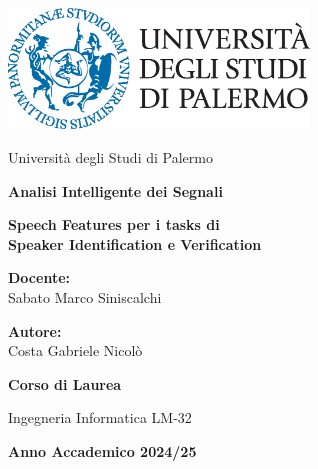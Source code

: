 \documentclass[12pt]{report}
\begin{document}


\begin{titlepage}
    \centering
    
    \includegraphics[width=0.6\textwidth]{logounipa.png} 
    
    \vspace{1cm}
    
    {\large Università degli Studi di Palermo \par}
    
    \vspace{1cm}
    
    {\Large \bfseries Analisi Intelligente dei Segnali \par}
    
    \vspace{1.5cm}
    
    {\Huge \textbf{Speech Features per i tasks di \\ Speaker Identification e Verification} \par}
    \vspace{2cm}
    
    \noindent
    \begin{minipage}{0.45\textwidth}
        \raggedright
        {\large \bfseries Docente:} \\
        {\large Sabato Marco Siniscalchi}
    \end{minipage}
    \hfill
    \begin{minipage}{0.45\textwidth}
        \raggedleft
        {\large \bfseries Autore:} \\
        {\large Costa Gabriele Nicolò}
    \end{minipage}


    
    \vspace{2cm}
    
    {\Large \bfseries Corso di Laurea \par}
    {\large Ingegneria Informatica LM-32 \par}

    \vspace{2cm}

    {\Large \bfseries Anno Accademico 2024/25 \par}
    
\end{titlepage}

\tableofcontents

\newpage

\newpage

\newpage 

\newpage 


\printbibliography
\end{document}
